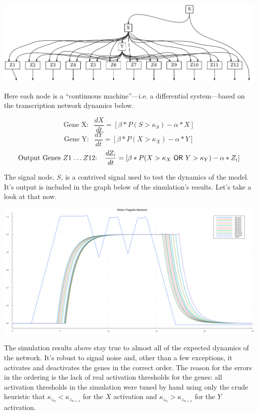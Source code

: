 \documentclass[12pt]{article}
\begin{document}
\begin{center}
    \includegraphics*[scale=0.5]{motor_flagella_network.png}
\end{center}

Here each node is a ``continuous machine''---i.e. a differential system---based on the transcription network dynamics below.

$$\text{Gene X: } \ \ \frac{dX}{dt} = [\beta*P(S > \kappa_S) - \alpha * X]$$
$$\text{Gene Y: } \ \ \frac{dY}{dt} = [\beta*P(X > \kappa_X) - \alpha * Y]$$
$$\text{Output Genes $Z1$ \dots $Z12$: } \ \ \frac{dZ_i}{dt} = [\beta*P(X > \kappa_X \ \mathsf{OR} \ Y > \kappa_Y) - \alpha * Z_i]$$

The signal node, $S$, is a contrived signal used to test the dynamics of the model.
It's output is included in the graph below of the simulation's results.
Let's take a look at that now.

\begin{center}
    \includegraphics*[scale=0.25]{motor_flagella.png}
\end{center}

The simulation results above stay true to almost all of the expected dynamics of the network.
It's robust to signal noise and, other than a few exceptions, it activates and deactivates the genes in the correct order.
The reason for the errors in the ordering is the lack of real activation thresholds for the genes: all activation thresholds in the simulation were tuned by hand using only the crude heuristic that $\kappa_{z_n} < \kappa_{z_{n+1}}$ for the $X$ activation and $\kappa_{z_n} > \kappa_{z_{n+1}}$ for the $Y$ activation.
\end{document}
